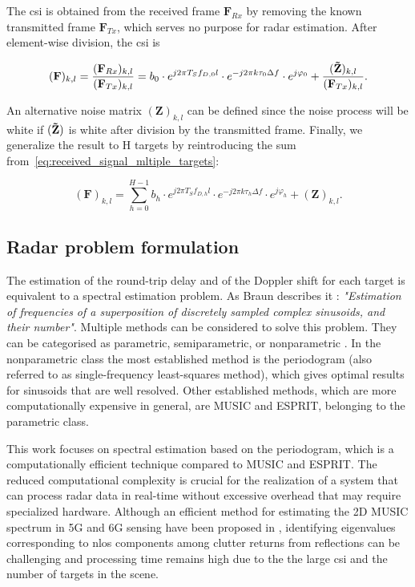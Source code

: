     \alert{The \gls{csi} is obtained from the received frame $\mathbf{F}_{Rx}$ by removing the known transmitted frame $\mathbf{F}_{Tx}$, which serves no purpose for radar estimation. After element-wise division, the \gls{csi} is}
    
    \begin{equation}
        (\mathbf F)_{k,l} = \frac{(\mathbf F_{Rx})_{k,l}}{(\mathbf F_{Tx})_{k,l}} = b_0 \cdot e^{j2\pi T_S f_{D,0} l}\cdot e^{-j2\pi k \tau_0 \Delta f} \cdot e^{j\varphi_0} + \frac{(\mathbf{\Tilde{Z}})_{k,l}}{(\mathbf F_{Tx})_{k,l}}\label{eq:CSI_frame}.    
    \end{equation}
    
    An alternative noise matrix $(\mathbf{Z})_{k,l}$ can be defined since the noise process will be white if $(\mathbf{\Tilde{Z}})$ is white after division by the transmitted frame.
    Finally, we generalize the result to H targets by reintroducing the sum from~\eqref{eq:received_signal_mltiple_targets}:
    
    \begin{equation}
        (\mathbf F)_{k,l} =  \sum_{h=0}^{H-1} b_h \cdot e^{j2\pi T_S f_{D,h} l}\cdot e^{-j2\pi k \tau_h \Delta f} \cdot e^{j\varphi_h} + (\mathbf{Z})_{k,l}.
    \end{equation}
    
    \subsection{Radar problem formulation}
    
    The estimation of the round-trip delay and of the Doppler shift for each target is equivalent to a spectral estimation problem. As Braun describes it \cite{Braun2014OFDMRA}: \textit{"Estimation of frequencies of a superposition of discretely sampled complex sinusoids, and their number"}.
    Multiple methods can be considered to solve this problem. They can be categorised as parametric, semiparametric, or nonparametric \cite{Stoica_New_Method_Parameter_Estimation}. 
    In the nonparametric class the most established method is the periodogram (also referred to as single-frequency least-squares method), which gives optimal results for sinusoids that are well resolved.
    Other established methods, which are more computationally expensive in general, are MUSIC and ESPRIT, belonging to the parametric class.
    
    \alert{This work focuses on spectral estimation based on the periodogram, which is a computationally efficient technique compared to MUSIC and ESPRIT.}
    The reduced computational complexity is crucial for the realization of a system that can process radar data in real-time without excessive overhead that may require specialized hardware.
    Although an efficient method for estimating the 2D MUSIC spectrum in 5G and 6G sensing have been proposed in \cite{Henninger_Mandelli_Arnold_EfficientMUSIC}, identifying eigenvalues corresponding to \gls{nlos} components among clutter returns from reflections can be challenging and processing time remains high due to the the large \gls{csi} and the number of targets in the scene.
    
